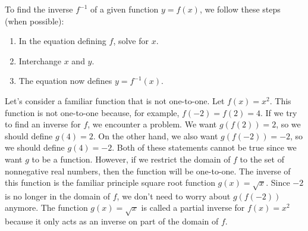 To find the inverse $f^{-1}$ of a given function $y=f(x)$, we follow these steps (when possible):
\begin{enumerate}
\item In the equation defining $f$, solve for $x$.
\item Interchange $x$ and $y$.
\item The equation now defines $y=f^{-1}(x)$.
\end{enumerate}


Let's consider a familiar function that is not one-to-one. Let $f(x)=x^2$.
This function is not one-to-one because, for example, $f(-2)=f(2)=4$. If we try to find an inverse for $f$, we encounter a problem. We want $g(f(2))=2$, so we should define $g(4)=2$. On the other hand, we also want $g(f(-2))=-2$, so we should define $g(4)=-2$. Both of these statements cannot be true since we want $g$ to be a function. However, if we restrict the domain of $f$ to the set of nonnegative real numbers, then the function will be one-to-one. The inverse of this function is the familiar principle square root function $g(x)=\sqrt x$. Since $-2$ is no longer in the domain of $f$, we don't need to worry about $g(f(-2))$ anymore. The function $g(x)=\sqrt x$ is called a partial inverse for $f(x)=x^2$ because it only acts as an inverse on part of the domain of $f$.

